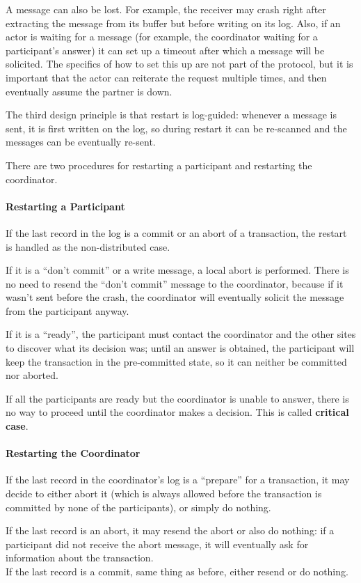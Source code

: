 A message can also be lost. For example, the receiver may crash right after extracting the message from its buffer but before writing on its log. Also, if an actor is waiting for a message (for example, the coordinator waiting for a participant's answer) it can set up a timeout after which a message will be solicited. The specifics of how to set this up are not part of the protocol, but it is important that the actor can reiterate the request multiple times, and then eventually assume the partner is down.

The third design principle is that restart is log-guided: whenever a message is sent, it is first written on the log, so during restart it can be re-scanned and the messages can be eventually re-sent.

There are two procedures for restarting a participant and restarting the coordinator.

\paragraph{Restarting a Participant}
If the last record in the log is a commit or an abort of a transaction, the restart is handled as the non-distributed case.

If it is a ``don't commit'' or a write message, a local abort is performed. There is no need to resend the ``don't commit'' message to the coordinator, because if it wasn't sent before the crash, the coordinator will eventually solicit the message from the participant anyway.

If it is a ``ready'', the participant must contact the coordinator and the other sites to discover what its decision was; until an answer is obtained, the participant will keep the transaction in the pre-committed state, so it can neither be committed nor aborted.

If all the participants are ready but the coordinator is unable to answer, there is no way to proceed until the coordinator makes a decision. This is called \textbf{critical case}.

\paragraph{Restarting the Coordinator}
If the last record in the coordinator's log is a ``prepare'' for a transaction, it may decide to either abort it (which is always allowed before the transaction is committed by none of the participants), or simply do nothing.

If the last record is an abort, it may resend the abort or also do nothing: if a participant did not receive the abort message, it will eventually ask for information about the transaction. \\
If the last record is a commit, same thing as before, either resend or do nothing.

